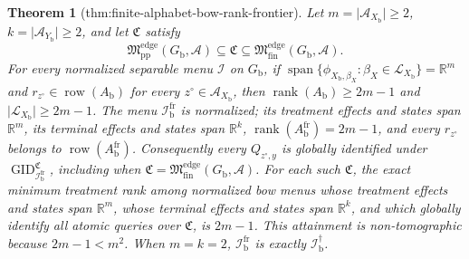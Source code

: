 \documentclass{article}
\newtheorem{theorem}{Theorem}
\begin{document}
\begin{theorem}[thm:finite-alphabet-bow-rank-frontier]\label{thm:finite-alphabet-bow-rank-frontier}
Let \(m=\lvert\mathcal A_{X_{\mathrm b}}\rvert\geq2\), \(k=\lvert\mathcal A_{Y_{\mathrm b}}\rvert\geq2\), and let \(\mathfrak C\) satisfy
\[
\mathfrak M_{\mathrm{pp}}^{\mathrm{edge}}(G_{\mathrm b},\mathcal A)
\subseteq\mathfrak C
\subseteq\mathfrak M_{\mathrm{fin}}^{\mathrm{edge}}(G_{\mathrm b},\mathcal A).
\]
For every normalized separable menu \(\mathcal I\) on \(G_{\mathrm b}\), if \(\operatorname{span}\{\phi_{X_{\mathrm b},\beta_X}:\beta_X\in\mathcal L_{X_{\mathrm b}}\}=\mathbb R^m\) and \(r_{z^{\circ}}\in\operatorname{row}(A_{\mathrm b})\) for every \(z^{\circ}\in\mathcal A_{X_{\mathrm b}}\), then \(\operatorname{rank}(A_{\mathrm b})\geq2m-1\) and \(\lvert\mathcal L_{X_{\mathrm b}}\rvert\geq2m-1\).  The menu \(\mathcal I_{\mathrm b}^{\mathrm{fr}}\) is normalized; its treatment effects and states span \(\mathbb R^m\), its terminal effects and states span \(\mathbb R^k\), \(\operatorname{rank}(A_{\mathrm b}^{\mathrm{fr}})=2m-1\), and every \(r_{z^{\circ}}\) belongs to \(\operatorname{row}(A_{\mathrm b}^{\mathrm{fr}})\).  Consequently every \(Q_{z^{\circ},y}\) is globally identified under \(\operatorname{GID}_{\mathcal I_{\mathrm b}^{\mathrm{fr}}}^{\mathfrak C}\), including when \(\mathfrak C=\mathfrak M_{\mathrm{fin}}^{\mathrm{edge}}(G_{\mathrm b},\mathcal A)\).  For each such \(\mathfrak C\), the exact minimum treatment rank among normalized bow menus whose treatment effects and states span \(\mathbb R^m\), whose terminal effects and states span \(\mathbb R^k\), and which globally identify all atomic queries over \(\mathfrak C\), is \(2m-1\).  This attainment is non-tomographic because \(2m-1<m^2\).  When \(m=k=2\), \(\mathcal I_{\mathrm b}^{\mathrm{fr}}\) is exactly \(\mathcal I_{\mathrm b}^{\dagger}\).
\end{theorem}
\end{document}
